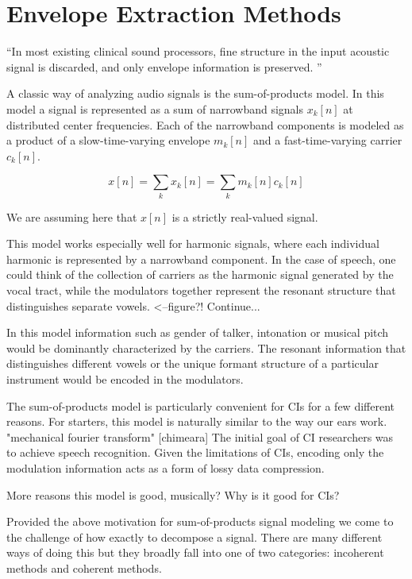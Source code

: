 \documentclass [11pt, proquest] {uwthesis}[2015/03/03]
\begin{document}
\section{Envelope Extraction Methods}

``In most existing clinical sound processors, fine structure in the input acoustic signal is discarded, and only envelope information is preserved. ''  %


A classic way of analyzing audio signals is the sum-of-products model.  In this model a signal is represented as a sum of narrowband signals $x_k[n]$ at distributed center frequencies.  Each of the narrowband components is modeled as a product of a slow-time-varying envelope $m_k[n]$ and a fast-time-varying carrier $c_k[n]$.


\begin{equation}
\label{eq:sum-of-products}
x[n] = \sum\limits_k x_k[n] = \sum\limits_k m_k[n] c_k[n]
\end{equation}


We are assuming here that $x[n]$ is a strictly real-valued signal.

This model works especially well for harmonic signals, where each individual harmonic is represented by a narrowband component.  In the case of speech, one could think of the collection of carriers as the harmonic signal generated by the vocal tract, while the modulators together represent the resonant structure that distinguishes separate vowels. <--figure?!  Continue...

In this model information such as gender of talker, intonation or musical pitch would be dominantly characterized by the carriers.  The resonant information that distinguishes different vowels or the unique formant structure of a particular instrument would be encoded in the modulators.

The sum-of-products model is particularly convenient for CIs for a few different reasons. For starters, this model is naturally similar to the way our ears work. "mechanical fourier transform" [chimeara] The initial goal of CI researchers was to achieve speech recognition.  Given the limitations of CIs, encoding only the modulation information acts as a form of lossy data compression.

More reasons this model is good, musically?
Why is it good for CIs?

Provided the above motivation for sum-of-products signal modeling we come to the challenge of how exactly to decompose a signal.  There are many different ways of doing this but they broadly fall into one of two categories: incoherent methods and coherent methods.
\end{document}
